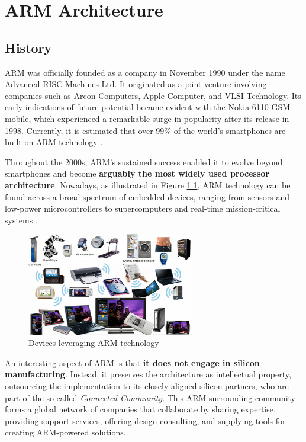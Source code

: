 \documentclass[english, ing, kiv, he, iso690numb, pdf]{fasthesis}
\begin{document}
	\chapter{ARM Architecture} \label{chapter-ARM Architecture}
	
	\section{History}
	
	ARM was officially founded as a company in November 1990 under the name \break Advanced RISC Machines Ltd. It originated as a joint venture involving companies such as Arcon Computers, Apple Computer, and VLSI Technology. Its early indications of future potential became evident with the Nokia 6110 GSM mobile, which experienced a remarkable surge in popularity after its release in 1998. Currently, it is estimated that over 99\% of the world's smartphones are built on ARM \break technology \cite{ARM-history}.
	
	Throughout the 2000s, ARM's sustained success enabled it to evolve beyond smartphones and become \textbf{arguably the most widely used processor architecture}. Nowadays, as illustrated in Figure \ref{Devices leveraging ARM technology}, ARM technology can be found across a broad spectrum of embedded devices, ranging from sensors and low-power microcontrollers to supercomputers and real-time mission-critical systems \cite{ARM-history}.
	
	\begin{figure}[ht]
		\centering
		\includegraphics[width=0.65\textwidth]{img/diagrams/arm_powered_products.jpg}
		\caption{Devices leveraging ARM technology}
		\label{Devices leveraging ARM technology}
	\end{figure}
	
	An interesting aspect of ARM is that \textbf{it does not engage in silicon manufacturing}. Instead, it preserves the architecture as intellectual property, outsourcing the implementation to its closely aligned silicon partners, who are part of the so-called \textit{Connected Community}. This ARM surrounding community forms a global network of companies that collaborate by sharing expertise, providing support services, offering design consulting, and supplying tools for creating ARM-powered solutions.
	
\end{document}
